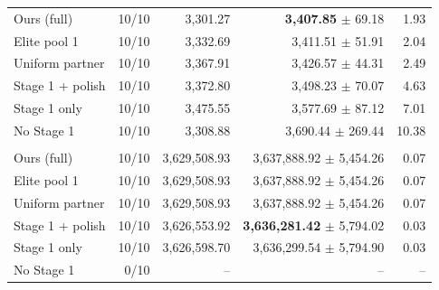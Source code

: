 \begin{table}[tbp]
\begin{tabular}{lrrrr}
\quad Ours (full) & 10/10 & 3{,}301.27 & \textbf{3{,}407.85} $\pm$ 69.18 & 1.93 \\
\quad Elite pool 1 & 10/10 & 3{,}332.69 & 3{,}411.51 $\pm$ 51.91 & 2.04 \\
\quad Uniform partner & 10/10 & 3{,}367.91 & 3{,}426.57 $\pm$ 44.31 & 2.49 \\
\quad Stage 1 + polish & 10/10 & 3{,}372.80 & 3{,}498.23 $\pm$ 70.07 & 4.63 \\
\quad Stage 1 only & 10/10 & 3{,}475.55 & 3{,}577.69 $\pm$ 87.12 & 7.01 \\
\quad No Stage 1 & 10/10 & 3{,}308.88 & 3{,}690.44 $\pm$ 269.44 & 10.38 \\
\addlinespace
\multicolumn{5}{l}{\textit{Du62} (budget 150~s)}\\
\quad Ours (full) & 10/10 & 3{,}629{,}508.93 & 3{,}637{,}888.92 $\pm$ 5{,}454.26 & 0.07 \\
\quad Elite pool 1 & 10/10 & 3{,}629{,}508.93 & 3{,}637{,}888.92 $\pm$ 5{,}454.26 & 0.07 \\
\quad Uniform partner & 10/10 & 3{,}629{,}508.93 & 3{,}637{,}888.92 $\pm$ 5{,}454.26 & 0.07 \\
\quad Stage 1 + polish & 10/10 & 3{,}626{,}553.92 & \textbf{3{,}636{,}281.42} $\pm$ 5{,}794.02 & 0.03 \\
\quad Stage 1 only & 10/10 & 3{,}626{,}598.70 & 3{,}636{,}299.54 $\pm$ 5{,}794.90 & 0.03 \\
\quad No Stage 1 & 0/10 & -- & -- & -- \\
\bottomrule
\end{tabular}
\end{table}
